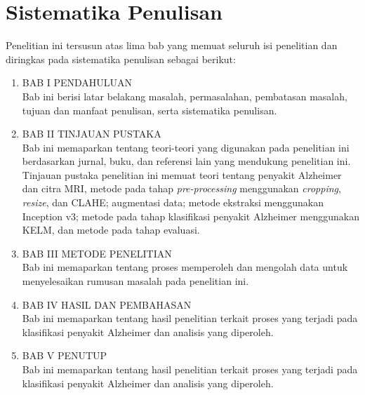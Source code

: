     \section{Sistematika Penulisan}
    Penelitian ini tersusun atas lima bab yang memuat seluruh isi penelitian dan diringkas pada sistematika penulisan sebagai berikut:
    \begin{enumerate}
        \item BAB I PENDAHULUAN\\
        Bab ini berisi latar belakang masalah, permasalahan, pembatasan masalah, tujuan dan manfaat penulisan, serta sistematika penulisan.
        \item BAB II TINJAUAN PUSTAKA\\
        Bab ini memaparkan tentang teori-teori yang digunakan pada penelitian ini berdasarkan jurnal, buku, dan referensi lain yang mendukung penelitian ini. Tinjauan pustaka penelitian ini memuat teori tentang penyakit Alzheimer dan citra MRI, metode pada tahap \textit{pre-processing} menggunakan \textit{cropping}, \textit{resize}, dan CLAHE; augmentasi data; metode ekstraksi menggunakan Inception v3; metode pada tahap klasifikasi penyakit Alzheimer menggunakan KELM, dan metode pada tahap evaluasi.
        \item BAB III METODE PENELITIAN\\
        Bab ini memaparkan tentang proses memperoleh dan mengolah data untuk menyelesaikan rumusan masalah pada penelitian ini.
        \item BAB IV HASIL DAN PEMBAHASAN\\
        Bab ini memaparkan tentang hasil penelitian terkait proses yang terjadi pada klasifikasi penyakit Alzheimer dan analisis yang diperoleh.
        \item BAB V PENUTUP\\
        Bab ini memaparkan tentang hasil penelitian terkait proses yang terjadi pada klasifikasi penyakit Alzheimer dan analisis yang diperoleh.
    \end{enumerate}